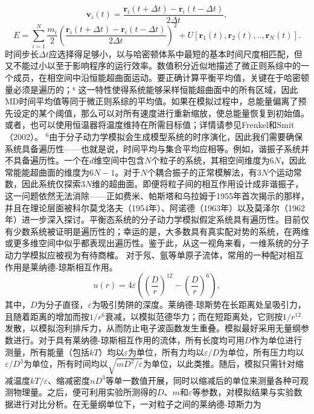 \begin{equation}\tag{16.2.11}\label{eq:16.2.11}
\pmb { v } _ { i } ( t ) = \frac { \pmb { r } _ { i } ( t + \Delta t ) - \pmb { r } _ { i } ( t - \Delta t ) } { 2 \Delta t } ,
\end{equation}
\begin{equation}\tag{16.2.12}\label{eq:16.2.12}
E = \sum _ { i = 1 } ^{N} \frac { m _ { i } } { 2 } \left( \frac { \pmb { r } _ { i } ( t + \Delta t ) - \pmb { r } _ { i } ( t - \Delta t ) } { 2 \Delta t } \right) ^{2} + U [ \pmb { r } _ { 1 } ( t ) , \pmb { r } _ { 2 } ( t ) , . . , \pmb { r } _ { N } ( t ) ] .
\end{equation}
时间步长\(\Delta t\)应选择得足够小，以与哈密顿体系中最短的基本时间尺度相匹配，但又不能过小以至于影响程序的运行效率。数值积分近似地描述了微正则系综中的一个成员，在相空间中沿恒能超曲面运动。要正确计算平衡平均值，关键在于哈密顿量必须是遍历的；⁶ 这一特性使得系统能够采样恒能超曲面中的所有区域，因此MD时间平均值等同于微正则系综的平均值。如果在模拟过程中，总能量偏离了预先设定的某个阈值，那么可以对所有速度进行重新缩放，使总能量恢复到初始值。或者，也可以使用恒温器将温度维持在所需目标值；详情请参见Frenkel和Smit（2002）。
\(^{6}\)由于分子动力学模拟会生成模型系统的时序演化，因此我们需要确保系统具备遍历性——也就是说，时间平均与集合平均应相等。例如，谐振子系统并不具备遍历性。一个在\(d\)维空间中包含\(N\)个粒子的系统，其相空间维度为\(6N\)，因此常能能超曲面的维度为\(6N-1\)。对于\(N\)个耦合振子的正常模解法，有\(3N\)个运动常数，因此系统仅探索\(3N\)维的超曲面。即便将粒子间的相互作用设计成非谐振子，这一问题依然无法消除——正如费米、帕斯塔和乌拉姆于1955年首次揭示的那样，并且在理论层面被科尔莫戈洛夫（1954年）、阿诺德（1963年）以及莫泽尔（1962年）进一步深入探讨。平衡态系统的分子动力学模拟假定系统具有遍历性。目前仅有少数系统被证明是遍历性的；幸运的是，大多数具有真实配对势的系统，在两维或更多维空间中似乎都表现出遍历性。鉴于此，从这一视角来看，一维系统的分子动力学模拟应被视为有待商榷。
对于氖、氩等单原子流体，常用的一种配对相互作用是莱纳德-琼斯相互作用。
\begin{equation}\tag{16.2.13}\label{eq:16.2.13}
u ( r ) = 4 \varepsilon \left( \left( \frac { D } { r } \right) ^{12} - \left( \frac { D } { r } \right) ^{6} \right) ,
\end{equation}
其中，\(D\)为分子直径，\(\varepsilon\)为吸引势阱的深度。莱纳德-琼斯势在长距离处呈吸引力，且随着距离的增加而按\(1/r^6\)衰减，以模拟范德华力；而在短距离处，它则按\(1/r^{12}\)发散，以模拟泡利排斥力，从而防止电子波函数发生重叠。模拟最好采用无量纲参数进行。对于具有莱纳德-琼斯相互作用的流体，所有长度均可用\(D\)作为单位进行测量，所有能量（包括\(kT\)）均以\(\varepsilon\)为单位，所有力均以\(\varepsilon/D\)为单位，所有压力均以\(\varepsilon/D^3\)为单位，所有时间均以\(\sqrt{mD^2/\varepsilon}\)为单位，以此类推。随后，模拟只需针对缩减温度\(kT/\varepsilon\)、缩减密度\(nD^3\)等单一数值开展，同时以缩减后的单位来测量各种可观测物理量。之后，便可利用实验所测得的\(D\)、\(m\)和\(\varepsilon\)等参数，对模拟结果与实验数据进行对比分析。在无量纲单位下，一对粒子之间的莱纳德-琼斯力为
